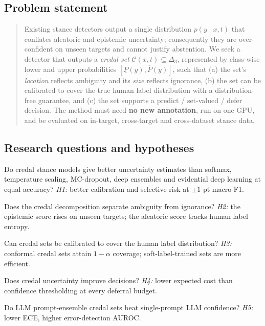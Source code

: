 \documentclass[11pt,a4paper]{article}
\newcommand{\lo}[1]{\underline{#1}}
\newcommand{\up}[1]{\overline{#1}}
\newcommand{\credal}{\mathcal{C}}
\begin{document}
\subsection{Problem statement}
\begin{quote}
Existing stance detectors output a single distribution $p(y\mid x,t)$ that conflates aleatoric and epistemic uncertainty; consequently they are over-confident on unseen targets and cannot justify abstention. We seek a detector that outputs a \emph{credal set} $\credal(x,t)\subseteq\Delta_3$, represented by class-wise lower and upper probabilities $[\lo{P}(y),\up{P}(y)]$, such that (a) the set's \emph{location} reflects ambiguity and its \emph{size} reflects ignorance, (b) the set can be calibrated to cover the true human label distribution with a distribution-free guarantee, and (c) the set supports a predict / set-valued / defer decision. The method must need \textbf{no new annotation}, run on one GPU, and be evaluated on in-target, cross-target and cross-dataset stance data.
\end{quote}

\subsection{Research questions and hypotheses}
\begin{description}[leftmargin=1.4cm,style=nextline]
\item[RQ1] Do credal stance models give better uncertainty estimates than softmax, temperature scaling, MC-dropout, deep ensembles and evidential deep learning at equal accuracy? \emph{H1:} better calibration and selective risk at $\pm1$ pt macro-F1.
\item[RQ2] Does the credal decomposition separate ambiguity from ignorance? \emph{H2:} the epistemic score rises on unseen targets; the aleatoric score tracks human label entropy.
\item[RQ3] Can credal sets be calibrated to cover the human label distribution? \emph{H3:} conformal credal sets attain $1-\alpha$ coverage; soft-label-trained sets are more efficient.
\item[RQ4] Does credal uncertainty improve decisions? \emph{H4:} lower expected cost than confidence thresholding at every deferral budget.
\item[RQ5] Do LLM prompt-ensemble credal sets beat single-prompt LLM confidence? \emph{H5:} lower ECE, higher error-detection AUROC.
\end{description}
\end{document}
